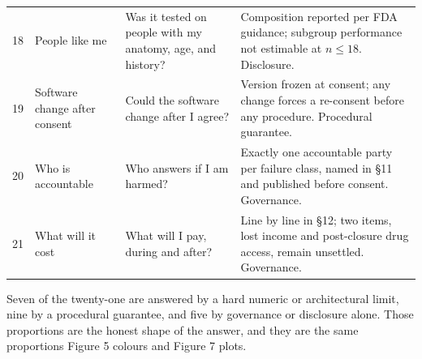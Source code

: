 \begin{xltabular}{\textwidth}{C{0.7cm} L{3.4cm} L{4.2cm} Y}
18 & People like me & Was it tested on people with my anatomy, age, and history? & Composition reported per FDA guidance; subgroup performance not estimable at $n \leq 18$. Disclosure. \\
19 & Software change after consent & Could the software change after I agree? & Version frozen at consent; any change forces a re-consent before any procedure. Procedural guarantee. \\
20 & Who is accountable & Who answers if I am harmed? & Exactly one accountable party per failure class, named in \S 11 and published before consent. Governance. \\
21 & What will it cost & What will I pay, during and after? & Line by line in \S 12; two items, lost income and post-closure drug access, remain unsettled. Governance. \\
\end{xltabular}

\vspace{0.30em}

\noindent Seven of the twenty-one are answered by a hard numeric or
architectural limit, nine by a procedural guarantee, and five by governance or
disclosure alone. Those proportions are the honest shape of the answer, and they
are the same proportions Figure 5 colours and Figure 7 plots.
